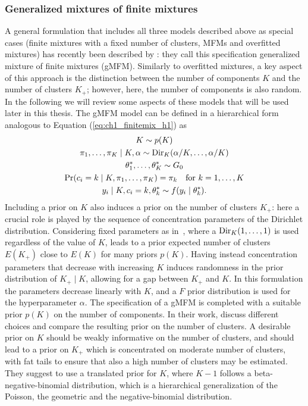 \subsubsection*{Generalized mixtures of finite mixtures}
A general formulation that includes all three models described above as special cases (finite mixtures with a fixed number of clusters, MFMs and overfitted mixtures) has recently been described by \citet{fruhwirthschnatter2020}: they call this specification generalized mixture of finite mixtures (gMFM). Similarly to overfitted mixtures, a key aspect of this approach is the distinction between the number of components $K$ and the number of clusters $K_+$; however, here, the number of components is also random. 
In the following we will review some aspects of these models that will be used later in this thesis.
The gMFM model can be defined in a hierarchical form analogous to Equation (\ref{eq:ch1_finitemix_h1}) as
\begin{equation*}
\begin{gathered}
K \sim p(K)\\
\pi_1,\dots,\pi_K \mid K, \alpha \sim \Dir_K(\alpha / K, \dots, \alpha / K)\\
\theta^*_1,\dots,\theta^*_K \sim G_0\\
\Pr(c_i = k \mid K, \pi_1,\dots,\pi_K) = \pi_k \quad \text{for } k = 1,\dots,K\\ 
y_i \mid K, c_i = k, \theta^*_k \sim f(y_i\mid\theta^*_k).
\end{gathered}
\label{eq:ch1_gMFM}
\end{equation*}
Including a prior on $K$ also induces a prior on the number of clusters $K_+$: here a crucial role is played by the sequence of concentration parameters of the Dirichlet distribution. Considering fixed parameters as in~\citet{miller2018}, where a $\mathrm{Dir}_K(1,\dots,1)$ is used regardless of the value of $K$, leads to a prior expected number of clusters $E(K_+)$ close to $E(K)$ for many priors $p(K)$. Having instead concentration parameters that decrease with increasing $K$ induces randomness in the prior distribution of $K_+\mid K$, allowing for a gap between $K_+$ and $K$. In this formulation the parameters decrease linearly with $K$, and a $F$ prior distribution is used for the hyperparameter $\alpha$.
The specification of a gMFM is completed with a suitable prior $p(K)$ on the number of components. In their work, \citet{fruhwirthschnatter2020} discuss different choices and compare the resulting prior on the number of clusters. 
A desirable prior on $K$ should be weakly informative on the number of clusters, and should lead to a prior on $K_+$ which is concentrated on moderate number of clusters, with fat tails to ensure that also a high number of clusters may be estimated. They suggest to use a translated prior for $K$, where $K-1$ follows a beta-negative-binomial distribution, which is a hierarchical generalization of the Poisson, the geometric and the negative-binomial distribution.

